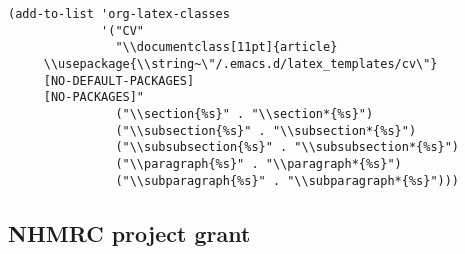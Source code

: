 \documentclass[12pt]{article}
\begin{document}
\begin{verbatim}
(add-to-list 'org-latex-classes
             '("CV"
               "\\documentclass[11pt]{article}
     \\usepackage{\\string~\"/.emacs.d/latex_templates/cv\"}
     [NO-DEFAULT-PACKAGES]
     [NO-PACKAGES]"
               ("\\section{%s}" . "\\section*{%s}")
               ("\\subsection{%s}" . "\\subsection*{%s}")
               ("\\subsubsection{%s}" . "\\subsubsection*{%s}")
               ("\\paragraph{%s}" . "\\paragraph*{%s}")
               ("\\subparagraph{%s}" . "\\subparagraph*{%s}")))
\end{verbatim}

\subsection{NHMRC project grant}
\label{sec:orgb1cd690}
\end{document}
